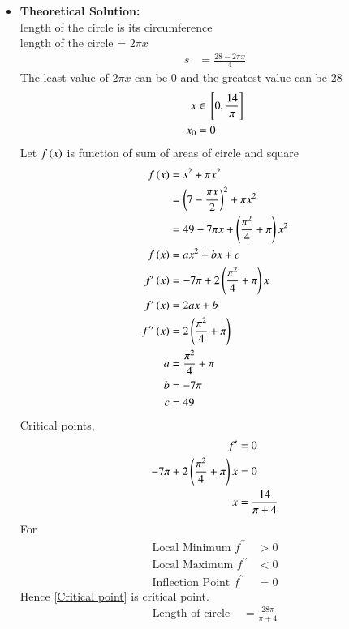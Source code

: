 \documentclass[journal]{IEEEtran}
\numberwithin{equation}{enumi}
\numberwithin{figure}{enumi}
\begin{document}
\begin{itemize}
    \item \textbf{Theoretical Solution:}\\
    length of the circle is its circumference\\
    length of the circle = $2\pi x$
    \begin{align}
        s &= \frac{28 - 2\pi x}{4}
    \end{align}
    The least value of $2\pi x$ can be 0 and the greatest value can be 28
    \begin{align}
        x &\in {}\left[0, \frac{14}{\pi}\right]\\
        x_0 &= 0
    \end{align}
    \newpage
    Let $f\left(x\right)$ is function of sum of areas of circle and square
    \begin{align}
        f\left(x\right) &= s^2 + \pi x^2\\
         &= \left(7 - \frac{\pi x}{2}\right)^2 + \pi x^2\\
         &= 49 - 7\pi x + \left(\frac{\pi^2}{4} + \pi\right)x^2\\
        f\left(x\right) &= ax^2 + bx + c \\
        f^{\prime}\left(x\right) &= -7\pi + 2\left(\frac{\pi^2}{4} + \pi\right)x\\
        f^{\prime}\left(x\right) &= 2ax + b\\
        f^{\prime\prime}\left(x\right) &= 2\left(\frac{\pi^2}{4} + \pi\right)\\
        a &= \frac{\pi^2}{4} + \pi\\
        b &= -7\pi\\
        c &= 49
    \end{align}
    Critical points, 
    \begin{align}
        f^{\prime} &= 0\\
        -7\pi + 2\left(\frac{\pi^2}{4} + \pi\right)x &= 0\\
        x &= \frac{14}{\pi + 4} \label{Critical point}
    \end{align}
    For
    \begin{align}
        \text{Local Minimum } f^{\prime\prime} &> 0\\
        \text{Local Maximum } f^{\prime\prime} &< 0\\
        \text{Inflection Point } f^{\prime\prime} &= 0
    \end{align}
    Hence \eqref{Critical point} is critical point.
    \begin{align}
        \text{Length of circle } &= \frac{28\pi}{\pi + 4}\\

\end{align}
\end{itemize}
\end{document}
